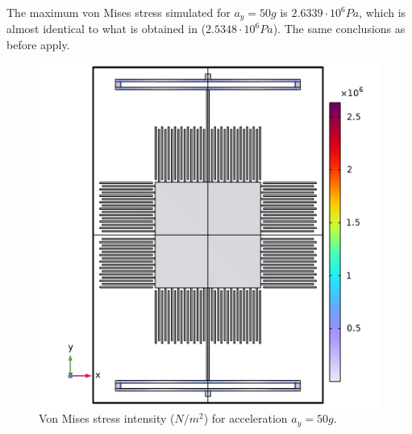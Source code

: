 \documentclass[lettersize,journal]{IEEEtran}
\begin{document}
    The maximum von Mises stress simulated for \(a_y=50g\) is \(2.6339\cdot10^6Pa\), which is almost identical to what is obtained in \cite{original} (\(2.5348\cdot10^6Pa\)). The same conclusions as before apply.
    
    \begin{figure}[!h]
        \centering
        \includegraphics[width=1.0\linewidth]{stress_ay}
        \caption{Von Mises stress intensity (\(N/m^2\)) for acceleration \(a_y=50g\).}
        \label{fig:stress_ay}
    \end{figure}
    
\end{document}
